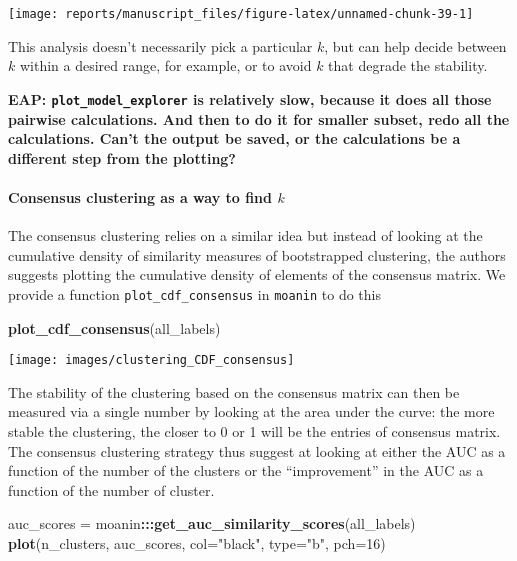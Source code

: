 \documentclass[9pt,a4paper,]{extarticle}
\newenvironment{Shaded}{\begin{snugshade}}{\end{snugshade}}
\newcommand{\DataTypeTok}[1]{\textcolor[rgb]{0.13,0.29,0.53}{#1}}
\newcommand{\DecValTok}[1]{\textcolor[rgb]{0.00,0.00,0.81}{#1}}
\newcommand{\KeywordTok}[1]{\textcolor[rgb]{0.13,0.29,0.53}{\textbf{#1}}}
\newcommand{\NormalTok}[1]{#1}
\newcommand{\OperatorTok}[1]{\textcolor[rgb]{0.81,0.36,0.00}{\textbf{#1}}}
\newcommand{\StringTok}[1]{\textcolor[rgb]{0.31,0.60,0.02}{#1}}
\begin{document}
\begin{center}\texttt{[image: reports/manuscript\_files/figure-latex/unnamed-chunk-39-1]} \end{center}

This analysis doesn't necessarily pick a particular \(k\), but can help decide between \(k\) within a desired range, for example, or to avoid \(k\) that degrade the stability.

\textbf{EAP: \texttt{plot\_model\_explorer} is relatively slow, because it does all those pairwise calculations. And then to do it for smaller subset, redo all the calculations. Can't the output be saved, or the calculations be a different step from the plotting?}

\hypertarget{consensus-clustering-as-a-way-to-find-k}{%
\paragraph{\texorpdfstring{Consensus clustering as a way to find \(k\)}{Consensus clustering as a way to find k}}\label{consensus-clustering-as-a-way-to-find-k}}

The consensus clustering \citep{monti:consensus} relies on a similar idea but
instead of looking at the cumulative density of similarity measures of
bootstrapped clustering, the authors suggests plotting the cumulative density
of elements of the consensus matrix. We provide a function
\texttt{plot\_cdf\_consensus} in \texttt{moanin} to do this

\begin{Shaded}
\begin{Highlighting}[]
\KeywordTok{plot_cdf_consensus}\NormalTok{(all_labels)}
\end{Highlighting}
\end{Shaded}

\begin{center}\texttt{[image: images/clustering\_CDF\_consensus]} \end{center}

The stability of the clustering based on the consensus matrix can then be
measured via a single number by looking at the area under the curve: the more
stable the clustering, the closer to 0 or 1 will be the entries of consensus
matrix. The consensus clustering strategy thus suggest at looking at either
the AUC as a function of the number of the clusters or the ``improvement'' in
the AUC as a function of the number of cluster.

\begin{Shaded}
\begin{Highlighting}[]
\NormalTok{auc_scores =}\StringTok{ }\NormalTok{moanin}\OperatorTok{:::}\KeywordTok{get_auc_similarity_scores}\NormalTok{(all_labels)}
\KeywordTok{plot}\NormalTok{(n_clusters, auc_scores, }\DataTypeTok{col=}\StringTok{"black"}\NormalTok{, }\DataTypeTok{type=}\StringTok{"b"}\NormalTok{, }\DataTypeTok{pch=}\DecValTok{16}\NormalTok{)}
\end{Highlighting}
\end{Shaded}
\end{document}
